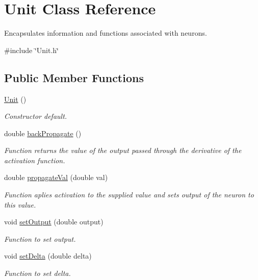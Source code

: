 \hypertarget{classUnit}{}\section{Unit Class Reference}
\label{classUnit}


Encapsulates information and functions associated with neurons.  




{\ttfamily \#include \char`\"{}Unit.\+h\char`\"{}}

\subsection*{Public Member Functions}
\begin{DoxyCompactItemize}
\item 
\hyperlink{classUnit_a8e46f663a95736c8002d85ab271a7581}{Unit} ()
\begin{DoxyCompactList}\small\item\em Constructor default. \end{DoxyCompactList}\item 
double \hyperlink{classUnit_afb1bb7be67560f6b9ea6631f7afc7f92}{back\+Propagate} ()
\begin{DoxyCompactList}\small\item\em Function returns the value of the output passed through the derivative of the activation function. \end{DoxyCompactList}\item 
double \hyperlink{classUnit_a62892313644dee7b63663ce95bd7b505}{propagate\+Val} (double val)
\begin{DoxyCompactList}\small\item\em Function aplies activation to the supplied value and sets output of the neuron to this value. \end{DoxyCompactList}\item 
void \hyperlink{classUnit_a9d9a98227aebd25718f9a8afcca9d387}{set\+Output} (double output)
\begin{DoxyCompactList}\small\item\em Function to set output. \end{DoxyCompactList}\item 
void \hyperlink{classUnit_aead5837864d17e39c8ffee702d7c9f3a}{set\+Delta} (double delta)
\begin{DoxyCompactList}\small\item\em Function to set delta. \end{DoxyCompactList}\item 

\end{DoxyCompactItemize}
